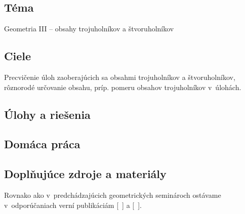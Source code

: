 
\subsection*{Téma}
Geometria III -- obsahy trojuholníkov a štvoruholníkov

\subsection*{Ciele}
Precvičenie úloh zaoberajúcich sa obsahmi trojuholníkov a štvoruholníkov,  rôznorodé určovanie obsahu, príp. pomeru obsahov trojuholníkov v~úlohách.

\subsection*{Úlohy a riešenia}













\subsection*{Domáca práca}




\subsection*{Doplňujúce zdroje a materiály}
Rovnako ako v~predchádzajúcich geometrických seminároch ostávame v~odporúčaniach verní publikáciám [~\cite{andreescu2013}] a [~\cite{kadlecek1996}].

